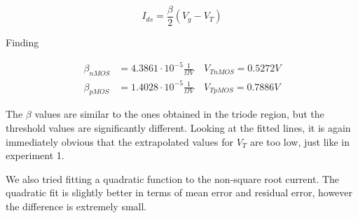 \begin{equation*}
    I_{ds} = \frac{\beta}{2}\left(V_g-V_T\right)
\end{equation*}

Finding

\begin{align*}
    \beta_{nMOS} &= 4.3861\cdot 10^{-5} \frac{1}{\Omega V} \quad V_{TnMOS} = 0.5272 V \\
    \beta_{pMOS} &= 1.4028\cdot 10^{-5} \frac{1}{\Omega V} \quad V_{TpMOS} = 0.7886 V
\end{align*}

The \(\beta\) values are similar to the ones obtained in the triode region, but the threshold values
are significantly different. Looking at the fitted lines, it is again immediately obvious that the 
extrapolated values for \(V_T\) are too low, just like in experiment 1.

We also tried fitting a quadratic function to the non-square root current. The quadratic fit is slightly better
in terms of mean error and residual error, however the difference is extremely small.

